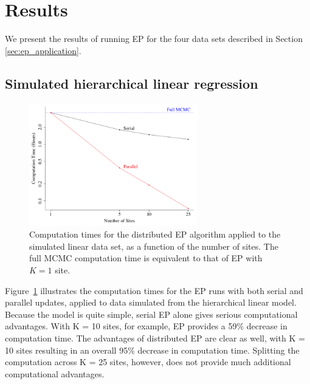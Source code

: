 \section{Results}
\label{sec:ep_results}

We present the results of running EP for the four data sets described in Section \ref{sec:ep_application}.

\subsection{Simulated hierarchical linear regression}
\label{subsec:ep_results_linear}

\begin{figure}
\centering
   \includegraphics[width=0.65\textwidth]{figures/ep_sim/linear_times.png}
\caption{Computation times for the distributed EP algorithm applied to the simulated linear data set, as a function of the number of sites. The full MCMC computation time is equivalent to that of EP with $K=1$ site.}\label{fig:ep_times_linear}
\end{figure}

Figure~\ref{fig:ep_times_linear} illustrates the computation times for the EP runs with both serial and parallel updates, applied to data simulated from the hierarchical linear model. Because the model is quite simple, serial EP alone gives serious computational advantages. With K = 10 sites, for example, EP provides a 59\% decrease in computation time. The advantages of distributed EP are clear as well, with K = 10 sites resulting in an overall 95\% decrease in computation time. Splitting the computation across K = 25 sites, however, does not provide much additional computational advantages.

